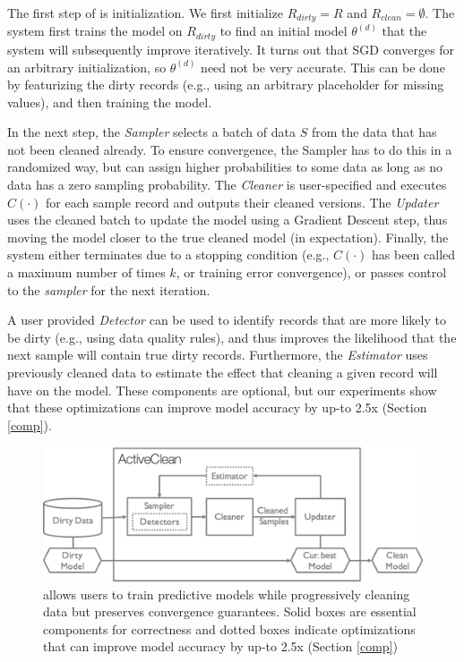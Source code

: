 The first step of \sys is initialization. We first initialize $R_{dirty} = R$ and $R_{clean} = \emptyset$.
The system first trains the model on $R_{dirty}$ to find an initial model $\theta^{(d)}$ that the system will subsequently improve iteratively.
It turns out that SGD converges for an arbitrary initialization, so $\theta^{(d)}$ need not be very accurate. 
This can be done by featurizing the dirty records (e.g., using an arbitrary placeholder for missing values), and then training the model.

In the next step, the {\it Sampler} selects a batch of data $S$ from the data that has not been cleaned already. To ensure convergence, the Sampler has to do this in a randomized way, but can assign higher probabilities to some data as long as no data has a zero sampling probability.
The {\it Cleaner} is user-specified and executes $C(\cdot)$ for each sample record and outputs their cleaned versions.
The {\it Updater} uses the cleaned batch to update the model using a Gradient Descent step, thus moving the model closer to the true cleaned model (in expectation).
Finally, the system either terminates due to a stopping condition (e.g., $C(\cdot)$ has been called a maximum number of times $k$, or training error convergence), or passes control to the {\it sampler} for the next iteration.

A user provided {\it Detector} can be used to identify records that are more likely to be dirty (e.g., using data quality rules), and thus improves the likelihood that the next sample will contain true dirty records. Furthermore, the {\it Estimator} uses previously cleaned data to estimate the effect that cleaning a given record will have on the model. These components are optional, but our experiments show that these optimizations can improve model accuracy by up-to 2.5x (Section \ref{comp}).

\begin{figure}[t]
\centering
 \includegraphics[width=\columnwidth]{figs/arch.png}
 \caption{\sysfull allows users to train predictive models while progressively cleaning data but preserves convergence guarantees. Solid boxes are essential components for correctness and 
 dotted boxes indicate optimizations that can improve model accuracy by up-to 2.5x (Section \ref{comp}) \label{sys-arch}}
\end{figure}

